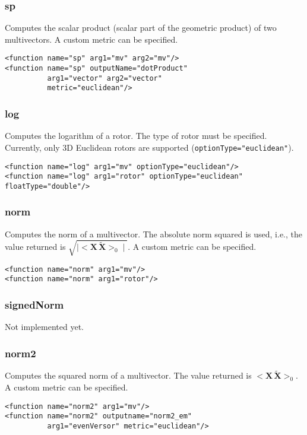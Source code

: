 \documentclass[10pt, a4paper]{article}
\newcommand{\gav}[1]{\ensuremath{\mathbf{#1}}}
\newcommand{\gp}{\,}
\newcommand{\rev}[1]{\widetilde{#1}}
\begin{document}
\subsubsection*{sp}

Computes the scalar product (scalar part of the geometric product) of two multivectors.
A custom metric can be specified.
\begin{verbatim}
<function name="sp" arg1="mv" arg2="mv"/>
<function name="sp" outputName="dotProduct" 
          arg1="vector" arg2="vector"
          metric="euclidean"/>
\end{verbatim}

\subsubsection*{log}



Computes the logarithm of a rotor. The type of rotor must be specified.
Currently, only 3D Euclidean rotors are supported ({\tt optionType="euclidean"}).
\begin{verbatim}
<function name="log" arg1="mv" optionType="euclidean"/>
<function name="log" arg1="rotor" optionType="euclidean" floatType="double"/>
\end{verbatim}

\subsubsection*{norm}

Computes the norm of a multivector.
The absolute norm squared is used, i.e., the value returned is $\sqrt{ \mid < \gav{X} \gp \rev{\gav{X}} >_{0} \mid}$.
A custom metric can be specified.
\begin{verbatim}
<function name="norm" arg1="mv"/>
<function name="norm" arg1="rotor"/>
\end{verbatim}

\subsubsection*{signedNorm}

Not implemented yet.

\subsubsection*{norm2}

Computes the squared norm of a multivector.
The value returned is $< \gav{X} \gp \rev{\gav{X}} >_{0}$.
A custom metric can be specified.
\begin{verbatim}
<function name="norm2" arg1="mv"/>
<function name="norm2" outputname="norm2_em"
          arg1="evenVersor" metric="euclidean"/>
\end{verbatim}
\end{document}
